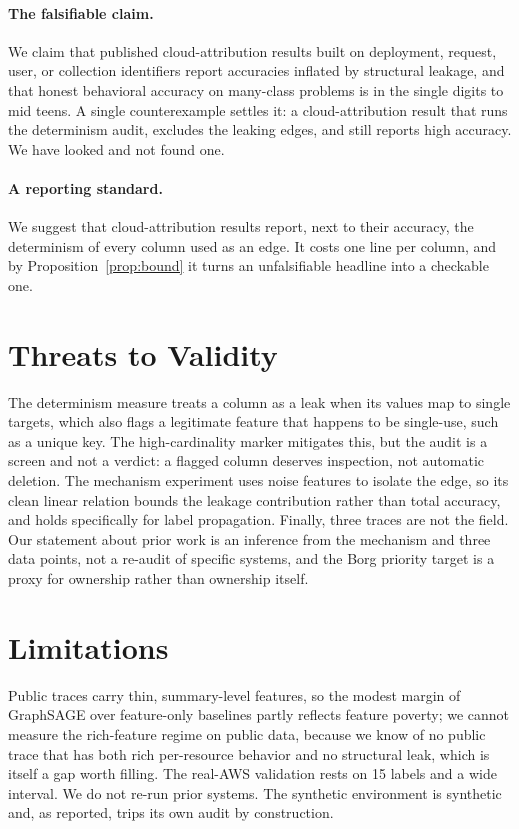 \documentclass[11pt]{article}
\begin{document}
\paragraph{The falsifiable claim.} We claim that published cloud-attribution
results built on deployment, request, user, or collection identifiers report
accuracies inflated by structural leakage, and that honest behavioral accuracy
on many-class problems is in the single digits to mid teens. A single
counterexample settles it: a cloud-attribution result that runs the determinism
audit, excludes the leaking edges, and still reports high accuracy. We have
looked and not found one.

\paragraph{A reporting standard.} We suggest that cloud-attribution results
report, next to their accuracy, the determinism of every column used as an edge.
It costs one line per column, and by Proposition~\ref{prop:bound} it turns an
unfalsifiable headline into a checkable one.

\section{Threats to Validity}

The determinism measure treats a column as a leak when its values map to single
targets, which also flags a legitimate feature that happens to be single-use,
such as a unique key. The high-cardinality marker mitigates this, but the audit
is a screen and not a verdict: a flagged column deserves inspection, not
automatic deletion. The mechanism experiment uses noise features to isolate the
edge, so its clean linear relation bounds the leakage contribution rather than
total accuracy, and holds specifically for label propagation. Finally, three
traces are not the field. Our statement about prior work is an inference from
the mechanism and three data points, not a re-audit of specific systems, and the
Borg priority target is a proxy for ownership rather than ownership itself.

\section{Limitations}
\label{sec:limitations}

Public traces carry thin, summary-level features, so the modest margin of
GraphSAGE over feature-only baselines partly reflects feature poverty; we cannot
measure the rich-feature regime on public data, because we know of no public
trace that has both rich per-resource behavior and no structural leak, which is
itself a gap worth filling. The real-AWS validation rests on 15 labels and a
wide interval. We do not re-run prior systems. The synthetic environment is
synthetic and, as reported, trips its own audit by construction.
\end{document}
